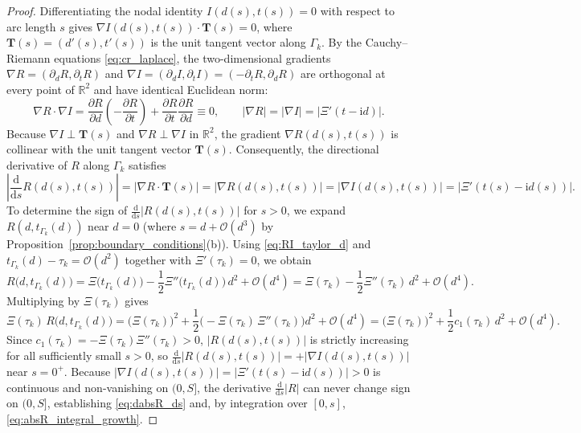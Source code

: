 \documentclass[11pt,a4paper,reqno]{amsart}
\theoremstyle{definition}
\theoremstyle{remark}
\numberwithin{equation}{section}
\newcommand{\dd}{\mathrm{d}}
\newcommand{\ii}{\mathrm{i}}
\begin{document}
\begin{proof}
Differentiating the nodal identity $I(d(s), t(s)) = 0$ with respect to arc length $s$ gives $\nabla I(d(s), t(s)) \cdot \mathbf{T}(s) = 0$, where $\mathbf{T}(s) = (d'(s), t'(s))$ is the unit tangent vector along $\Gamma_k$. By the Cauchy--Riemann equations \eqref{eq:cr_laplace}, the two-dimensional gradients $\nabla R = (\partial_d R, \partial_t R)$ and $\nabla I = (\partial_d I, \partial_t I) = (-\partial_t R, \partial_d R)$ are orthogonal at every point of $\mathbb{R}^2$ and have identical Euclidean norm:
\begin{equation}\label{eq:cr_orthogonality}
\nabla R \cdot \nabla I = \frac{\partial R}{\partial d}\left(-\frac{\partial R}{\partial t}\right) + \frac{\partial R}{\partial t}\frac{\partial R}{\partial d} \equiv 0, \qquad \big|\nabla R\big| = \big|\nabla I\big| = \big|\Xi'(t - \ii d)\big|.
\end{equation}
Because $\nabla I \perp \mathbf{T}(s)$ and $\nabla R \perp \nabla I$ in $\mathbb{R}^2$, the gradient $\nabla R(d(s), t(s))$ is collinear with the unit tangent vector $\mathbf{T}(s)$. Consequently, the directional derivative of $R$ along $\Gamma_k$ satisfies
\[
\left|\frac{\dd}{\dd s}R(d(s), t(s))\right| = \big|\nabla R \cdot \mathbf{T}(s)\big| = \big|\nabla R(d(s), t(s))\big| = \big|\nabla I(d(s), t(s))\big| = \big|\Xi'(t(s) - \ii d(s))\big|.
\]
To determine the sign of $\frac{\dd}{\dd s}|R(d(s), t(s))|$ for $s > 0$, we expand $R(d, t_{\Gamma_k}(d))$ near $d = 0$ (where $s = d + \mathcal{O}(d^3)$ by Proposition~\ref{prop:boundary_conditions}(b)). Using \eqref{eq:RI_taylor_d} and $t_{\Gamma_k}(d) - \tau_k = \mathcal{O}(d^2)$ together with $\Xi'(\tau_k) = 0$, we obtain
\[
R\big(d, t_{\Gamma_k}(d)\big) = \Xi\big(t_{\Gamma_k}(d)\big) - \frac{1}{2}\Xi''\big(t_{\Gamma_k}(d)\big)\,d^2 + \mathcal{O}(d^4) = \Xi(\tau_k) - \frac{1}{2}\Xi''(\tau_k)\,d^2 + \mathcal{O}(d^4).
\]
Multiplying by $\Xi(\tau_k)$ gives
\[
\Xi(\tau_k)\,R\big(d, t_{\Gamma_k}(d)\big) = \big(\Xi(\tau_k)\big)^2 + \frac{1}{2}\Big(-\Xi(\tau_k)\,\Xi''(\tau_k)\Big)d^2 + \mathcal{O}(d^4) = \big(\Xi(\tau_k)\big)^2 + \frac{1}{2}c_1(\tau_k)\,d^2 + \mathcal{O}(d^4).
\]
Since $c_1(\tau_k) = -\Xi(\tau_k)\Xi''(\tau_k) > 0$, $|R(d(s), t(s))|$ is strictly increasing for all sufficiently small $s > 0$, so $\frac{\dd}{\dd s}|R(d(s), t(s))| = +|\nabla I(d(s), t(s))|$ near $s = 0^+$. Because $|\nabla I(d(s), t(s))| = |\Xi'(t(s)-\ii d(s))| > 0$ is continuous and non-vanishing on $(0, S]$, the derivative $\frac{\dd}{\dd s}|R|$ can never change sign on $(0, S]$, establishing \eqref{eq:dabsR_ds} and, by integration over $[0,s]$, \eqref{eq:absR_integral_growth}.
\end{proof}
\end{document}
